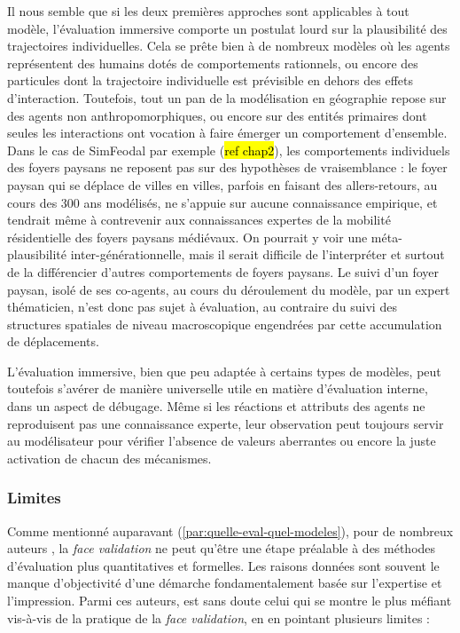 Il nous semble que si les deux premières approches sont applicables à tout modèle, l'évaluation immersive comporte un postulat lourd sur la plausibilité des trajectoires individuelles.
Cela se prête bien à de nombreux modèles où les agents représentent des humains dotés de comportements rationnels, ou encore des particules dont la trajectoire individuelle est prévisible en dehors des effets d'interaction.
Toutefois, tout un pan de la modélisation en géographie repose sur des agents non anthropomorphiques, ou encore sur des entités primaires dont seules les interactions ont vocation à faire émerger un comportement d'ensemble.
Dans le cas de SimFeodal par exemple (\hl{ref chap2}), les comportements individuels des foyers paysans ne reposent pas sur des hypothèses de vraisemblance :
	le foyer paysan qui se déplace de villes en villes, parfois en faisant des allers-retours, au cours des 300 ans modélisés, ne s'appuie sur aucune connaissance empirique, et tendrait même à contrevenir aux connaissances expertes de la mobilité résidentielle des foyers paysans médiévaux.
On pourrait y voir une \og méta-plausibilité\fg{} inter-générationnelle, mais il serait difficile de l'interpréter et surtout de la différencier d'autres comportements de foyers paysans.
Le suivi d'un foyer paysan, isolé de ses co-agents, au cours du déroulement du modèle, par un expert thématicien, n'est donc pas sujet à évaluation, au contraire du suivi des structures spatiales de niveau macroscopique engendrées par cette accumulation de déplacements.

L'évaluation immersive, bien que peu adaptée à certains types de modèles, peut toutefois s'avérer de manière universelle utile en matière d'évaluation interne, dans un aspect de \og débugage\fg{}.
Même si les réactions et attributs des agents ne reproduisent pas une connaissance experte, leur observation peut toujours servir au modélisateur pour vérifier l'absence de valeurs aberrantes ou encore la juste activation de chacun des mécanismes.



\subsubsection{Limites}

Comme mentionné auparavant (\ref{par:quelle-eval-quel-modeles}), pour de nombreux auteurs \autocite{hermann_validation_1967, balci_validation_1994, kennedy_verification_2006}, la \textit{face validation} ne peut qu'être une étape préalable à des méthodes d'évaluation plus quantitatives et formelles.
Les raisons données sont souvent le manque d'objectivité d'une démarche fondamentalement basée sur l'expertise et l'impression.
Parmi ces auteurs, \citeauthor{hermann_validation_1967} est sans doute celui qui se montre le plus méfiant vis-à-vis de la pratique de la \textit{face validation}, en en pointant plusieurs limites :

